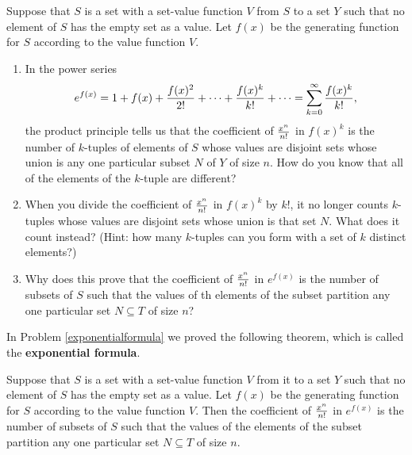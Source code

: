 \bp  

\itemes Suppose that $S$ is a set with a set-value function $V$ from $S$
to a set
$Y$ such that no element of $S$ has the empty set as a value.  Let $f(x)$
be the generating function for $S$ according to the value function
$V$.\label{exponentialformula}
\begin{enumerate}
\item In the power series $$e^{f(x)} = 1 + f(x) + {f(x)^2\over 2!} +
\cdots + {f(x)^k\over k!} + \cdots= \sum_{k=0}^\infty {f(x)^k\over k!},$$
the product principle tells us that the coefficient of $x^n\over n!$ in
$f(x)^k$ is the number of $k$-tuples of elements of $S$ whose
values are disjoint sets whose union is any one particular subset $N$ of
$Y$ of size $n$.  How do you know that all of the elements of the
$k$-tuple are different?
\item When you divide the coefficient of $x^n\over n!$ in $f(x)^k$ by
$k!$, it no longer counts $k$-tuples whose values are disjoint sets whose
union is that set $N$.  What does it count instead?  (Hint: how many
$k$-tuples can you form with a set of $k$ distinct elements?)
\item Why does this prove that the coefficient of $x^n\over n!$ in
$e^{f(x)}$ is the number of subsets of $S$ such that the values of th
elements of the subset partition any one particular set $N\subseteq T$ of
size
$n$?
\end{enumerate}
\ep
In Problem \ref{exponentialformula} we proved the following theorem,
which is called the {\bf exponential formula}.

\begin{theorem}  Suppose that $S$ is a set with a set-value function $V$ from it to a
set
$Y$ such that no element of $S$ has the empty set as a value.  Let $f(x)$
be the generating function for $S$ according to the value function
$V$.  Then the coefficient of $x^n\over n!$ in
$e^{f(x)}$ is the number of subsets of $S$ such that the values of the
elements of the subset partition any one particular set $N\subseteq T$ of
size
$n$.
\end{theorem}

